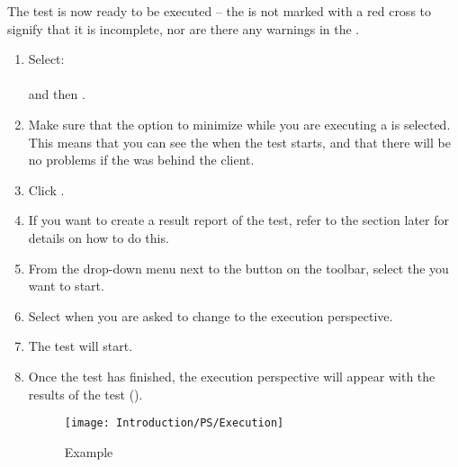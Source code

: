 The test is now ready to be executed -- the \gdsuite{} is not marked with a red cross to signify that it is incomplete, nor are there any warnings in the \gdprobview{}. 

\begin{enumerate}
\item Select:\\  \\
and then . 
\item Make sure that the option  to minimize \jb{} while you are executing a \gdsuite{} is selected. This means that you can see the \gdaut{} when the test starts, and that there will be no problems if the \gdaut{} was behind the \jb{} client. 
\item Click . 
\item If you want to create a result report of the test, refer to the section later  for details on how to do this. 
\item From the drop-down menu next to the  button on the toolbar, select the \gdsuite{} you want to start. 
\item Select  when you are asked to change to the execution perspective. 
\item The test will start.
\item Once the test has finished, the execution perspective will appear with the results of the test ().
\begin{figure}[h]
\texttt{[image: Introduction/PS/Execution]}
\caption{Example \gdsuite{}}
\label{Testshot}
\end{figure}



 \end{enumerate}

